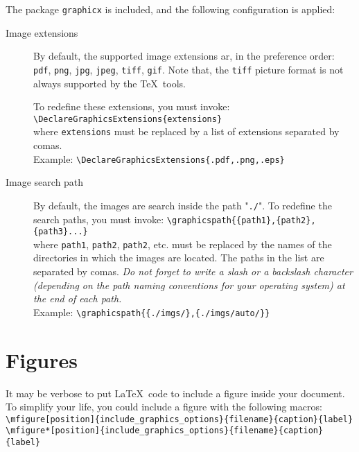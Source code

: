 \documentclass[book]{upmethodology-document}
\begin{document}
The package \texttt{graphicx} is included, and the following configuration is applied:
\begin{description}
\item[Image extensions] By default, the supported image extensions ar, in the preference order: \texttt{pdf}, \texttt{png}, \texttt{jpg}, \texttt{jpeg}, \texttt{tiff}, \texttt{gif}. Note that, the \texttt{tiff} picture format is not always supported by the \TeX\ tools.

To redefine these extensions, you must invoke:\\
	\texttt{{\textbackslash}DeclareGraphicsExtensions\{extensions\}} \\
	where \texttt{extensions} must be replaced by a list of extensions separated by comas. \\
	Example: \texttt{{\textbackslash}DeclareGraphicsExtensions\{.pdf,.png,.eps\}} \\
\item[Image search path] By default, the images are search inside the path "\texttt{./}". To redefine the search paths, you must invoke:
	\texttt{{\textbackslash}graphicspath\{\{path1\},\{path2\},\{path3\}...\}} \\
	where \texttt{path1}, \texttt{path2}, \texttt{path2}, etc. must be replaced by the names of the directories in which the images are located. The paths in the list are separated by comas. \emph{Do not forget to write a slash or a backslash character (depending on the path naming conventions for your operating system) at the end of each path.} \\
	Example: \texttt{{\textbackslash}graphicspath\{\{./imgs/\},\{./imgs/auto/\}\}} \\
\end{description}

\section{Figures}

It may be verbose to put \LaTeX\ code to include a figure inside your document. To simplify your life, you could include a figure with the following macros: \\
\texttt{{\textbackslash}mfigure[position]\{include\_graphics\_options\}\{filename\}\{caption\}\{label\}} \\
\texttt{{\textbackslash}mfigure*[position]\{include\_graphics\_options\}\{filename\}\{caption\}\{label\}} \\
\end{document}
